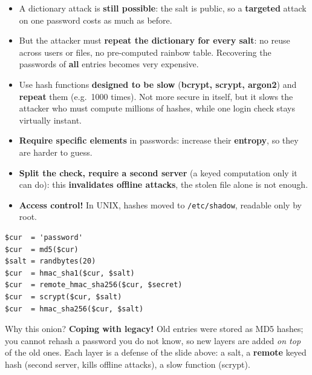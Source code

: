 \begin{propbox}[title=What the salt does and does not buy]
\begin{itemize}
  \item A dictionary attack is \textbf{still possible}: the salt is public, so a
        \textbf{targeted} attack on one password costs as much as before.
  \item But the attacker must \textbf{repeat the dictionary for every salt}: no reuse across
        users or files, no pre-computed rainbow table. Recovering the passwords of \textbf{all}
        entries becomes very expensive.
\end{itemize}
\end{propbox}

\begin{propbox}[title=Complementary defenses]
\begin{itemize}
  \item Use hash functions \textbf{designed to be slow} (\textbf{bcrypt, scrypt, argon2}) and
        \textbf{repeat} them (e.g.\ 1000 times). Not more secure in itself, but it slows the
        attacker who must compute millions of hashes, while one login check stays virtually
        instant.
  \item \textbf{Require specific elements} in passwords: increase their \textbf{entropy}, so
        they are harder to guess.
  \item \textbf{Split the check, require a second server} (a keyed computation only it can do):
        this \textbf{invalidates offline attacks}, the stolen file alone is not enough.
  \item \textbf{Access control!} In UNIX, hashes moved to \texttt{/etc/shadow}, readable only by
        root.
\end{itemize}
\end{propbox}

\begin{exbox}[title={Facebook's password ``onion'' (source: T.\ Ristenpart)}]
\begin{center}
\begin{minipage}{0.6\linewidth}
\begin{lstlisting}[numbers=none, frame=none]
$cur  = 'password'
$cur  = md5($cur)
$salt = randbytes(20)
$cur  = hmac_sha1($cur, $salt)
$cur  = remote_hmac_sha256($cur, $secret)
$cur  = scrypt($cur, $salt)
$cur  = hmac_sha256($cur, $salt)
\end{lstlisting}
\end{minipage}
\end{center}
Why this onion? \textbf{Coping with legacy!} Old entries were stored as MD5 hashes; you cannot
rehash a password you do not know, so new layers are added \emph{on top} of the old ones. Each layer
is a defense of the slide above: a salt, a \textbf{remote} keyed hash (second server, kills offline
attacks), a slow function (scrypt).
\end{exbox}

